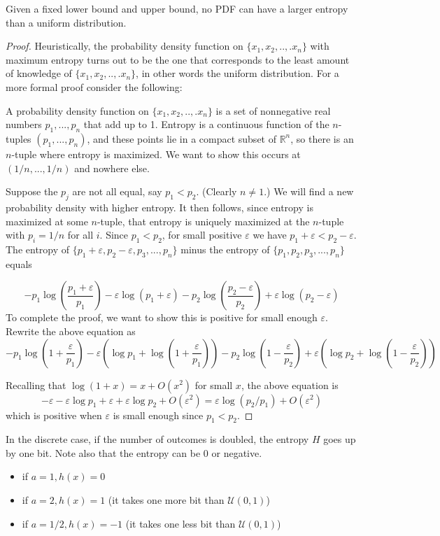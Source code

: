 \documentclass[11pt]{article}
\theoremstyle{definition}
\begin{document}
\theorem Given a fixed lower bound and upper bound, no PDF can have a larger entropy than a uniform distribution. 

\begin{proof}
Heuristically, the probability density function on $\{x_1, x_2,..,.x_n\}$ with maximum entropy turns out to be the one that corresponds to the least amount of knowledge of $\{x_1, x_2,..,.x_n\}$, in other words the uniform distribution. For a more formal proof consider the following:

A probability density function on $\{x_1, x_2,..,.x_n\}$  is a set of nonnegative real numbers $p_1,...,p_n$ that add up to 1. Entropy is a continuous function of the $n$-tuples $(p_1,...,p_n)$, and these points lie in a compact subset of $\mathbb{R}^n$, so there is an $n$-tuple where entropy is maximized. We want to show this occurs at $(1/n,...,1/n)$ and nowhere else.

Suppose the $p_j$ are not all equal, say $p_1 < p_2$. (Clearly $n\neq 1$.) We will find a new probability density with higher entropy. It then follows, since entropy is maximized at
some $n$-tuple, that entropy is uniquely maximized at the $n$-tuple with $p_i = 1/n$ for all $i$. Since $p_1 < p_2$, for small positive $\varepsilon$ we have $p_1 + \varepsilon < p_2 -\varepsilon$. The entropy of $\{p_1 + \varepsilon, p_2 -\varepsilon,p_3,...,p_n\}$ minus the entropy of $\{p_1,p_2,p_3,...,p_n\}$ equals

$$-p_1\log\left(\frac{p_1+\varepsilon}{p_1}\right)-\varepsilon\log(p_1+\varepsilon)-p_2\log\left(\frac{p_2-\varepsilon}{p_2}\right)+\varepsilon\log(p_2-\varepsilon)$$
To complete the proof, we want to show this is positive for small enough $\varepsilon$. Rewrite the above equation as
$$-p_1\log\left(1+\frac{\varepsilon}{p_1}\right)-\varepsilon\left(\log p_1+\log\left(1+\frac{\varepsilon}{p_1}\right)\right)-p_2\log\left(1-\frac{\varepsilon}{p_2}\right)+\varepsilon\left(\log p_2+\log\left(1-\frac{\varepsilon}{p_2}\right)\right)$$

\noindent Recalling that $\log(1 + x) = x + O(x^2)$ for small $x$, the above equation is
$$-\varepsilon-\varepsilon\log p_1 + \varepsilon + \varepsilon \log p_2 + O(\varepsilon^2) = \varepsilon\log(p_2/p_1) + O(\varepsilon^2)$$
which is positive when $\varepsilon$ is small enough since $p_1 < p_2$.

\end{proof}
\noindent In the discrete case, if the number of outcomes is doubled, the entropy $H$ goes up by one bit. Note also that the entropy can be 0 or negative.
\begin{itemize}
\item if $a = 1, h(x) = 0$
\item if $a = 2, h(x) = 1$ (it takes one more bit than $\mathcal{U}(0, 1)$)
\item if $a = 1/2, h(x) = -1$ (it takes one less bit than $\mathcal{U}(0, 1)$)
\end{itemize}
\end{document}
